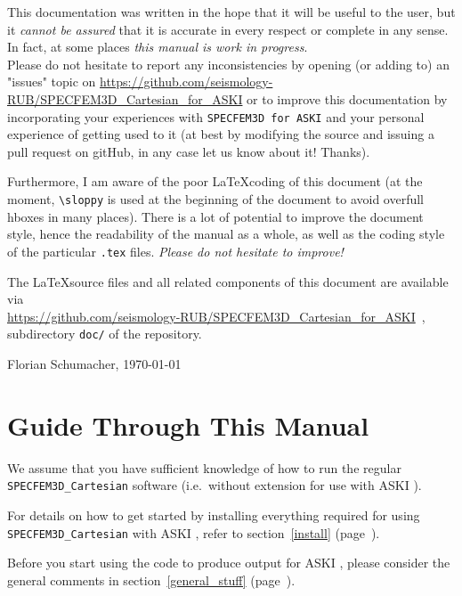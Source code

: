 \documentclass[12pt,a4paper]{article}
\newcommand{\lcode}[1]{\nolinkurl{#1}}
\newcommand{\ASKI}{ {\ttfamily ASKI} }
\newcommand{\myref}[1]{\ref{#1} (page~\pageref{#1})}
\begin{document}
\vspace{1em}

This documentation was written in the hope that it will be useful to the user,
but it \emph{cannot be assured} that it is accurate in every respect or complete in any sense.
In fact, at some places \emph{this manual is work in progress}.\\
Please do not hesitate to report any inconsistencies by
opening (or adding to) an "issues" topic on \url{https://github.com/seismology-RUB/SPECFEM3D_Cartesian_for_ASKI}
or to improve this documentation by incorporating your experiences with \lcode{SPECFEM3D for ASKI} 
and your personal experience of getting used to it (at best by modifying the source and issuing a pull request
on gitHub, in any case let us know about it! Thanks).

Furthermore, I am aware of the poor \LaTeX coding of this document (at the moment, \verb+\sloppy+ is used
at the beginning of the document to avoid overfull hboxes in many places). There is a lot of potential
to improve the document 
style, hence the readability of the manual as a whole, as well as the coding style of the 
particular \lcode{.tex} files. \emph{Please do not hesitate to improve!}

The \LaTeX source files and all related components of this document are available via\\
\url{https://github.com/seismology-RUB/SPECFEM3D_Cartesian_for_ASKI}~, subdirectory 
\lcode{doc/} of the repository.
\begin{flushright}
Florian Schumacher, \mydate \today
\end{flushright}

\newpage
%
\section*{Guide Through This Manual}
%
We assume that you have sufficient knowledge of how to run the regular \lcode{SPECFEM3D_Cartesian} software
(i.e.\ without extension for use with \ASKI{}).

For details on how to get started by installing everything required for using \lcode{SPECFEM3D_Cartesian} 
with \ASKI{}, refer to section~\myref{install}{}. 

Before you start using the code to produce output for \ASKI{}, please consider the general
comments in section~\myref{general_stuff}.
\end{document}
